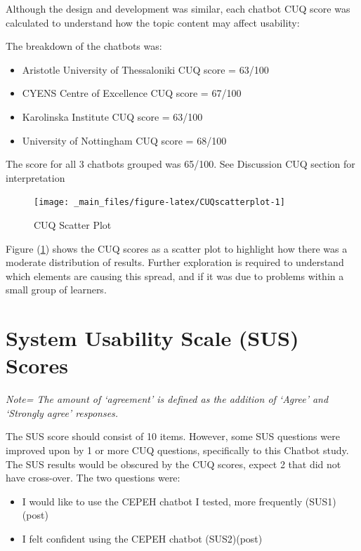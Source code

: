\documentclass[a4paper, nobind]{templates/ociamthesis}
\providecommand{\tightlist}{%
  \setlength{\itemsep}{0pt}\setlength{\parskip}{0pt}}
\begin{document}
Although the design and development was similar, each chatbot CUQ score was calculated to understand how the topic content may affect usability:

The breakdown of the chatbots was:

\begin{itemize}
\tightlist
\item
  Aristotle University of Thessaloniki CUQ score = 63/100
\item
  CYENS Centre of Excellence CUQ score = 67/100
\item
  Karolinska Institute CUQ score = 63/100
\item
  University of Nottingham CUQ score = 68/100
\end{itemize}

The score for all 3 chatbots grouped was 65/100. See Discussion CUQ
section for interpretation

\begin{figure}

{\centering \texttt{[image: \_main\_files/figure-latex/CUQscatterplot-1]} 

}

\caption{CUQ Scatter Plot}\label{fig:CUQscatterplot}
\end{figure}

Figure (\ref{fig:CUQscatterplot}) shows the CUQ scores as a scatter plot to highlight how there was a moderate distribution of results.
Further exploration is required to understand which elements are causing this spread, and if it was due to problems within a small group of learners.

\hypertarget{system-usability-scale-sus-scores}{%
\section{System Usability Scale (SUS) Scores}\label{system-usability-scale-sus-scores}}

\emph{Note= The amount of `agreement' is defined as the addition of `Agree'
and `Strongly agree' responses.}

The SUS score should consist of 10 items. However, some SUS questions were improved upon by 1 or more CUQ questions, specifically to this Chatbot study. The SUS results would be obscured by the CUQ scores, expect 2 that did not have cross-over. The two questions were:

\begin{itemize}
\tightlist
\item
  I would like to use the CEPEH chatbot I tested, more frequently
  (SUS1)(post)
\item
  I felt confident using the CEPEH chatbot (SUS2)(post)
\end{itemize}
\end{document}
